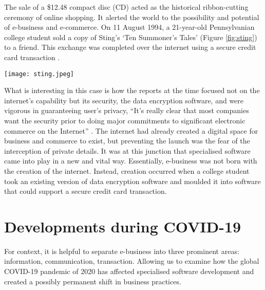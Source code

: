 \documentclass[a0,portrait]{a0poster}
\begin{document}
\begin{multicols}{2}
The sale of a \$12.48 compact disc (CD) acted as the historical ribbon-cutting ceremony of online shopping. It alerted the world to the possibility and potential of e-business and e-commerce. On 11 August 1994, a 21-year-old Pennsylvanian college student sold a copy of Sting’s ‘Ten Summoner’s Tales’ (Figure \ref{fig:sting}) to a friend. This exchange was completed over the internet using a secure credit card transaction \cite{arcand}.

\begin{wraptable}{l}{13cm} %
\begin{center}
\texttt{[image: sting.jpeg]}
\label{fig:sting}
\end{center}
\end{wraptable}

What is interesting in this case is how the reports at the time focused not on the internet’s capability but its security, the data encryption software, and were vigorous in guaranteeing user’s privacy, “It’s really clear that most companies want the security prior to doing major commitments to significant electronic commerce on the Internet” \cite{lewis}. The internet had already created a digital space for business and commerce to exist, but preventing the launch was the fear of the interception of private details. It was at this junction that specialised software came into play in a new and vital way. Essentially, e-business was not born with the creation of the internet. Instead, creation occurred when a college student took an existing version of data encryption software and moulded it into software that could support a secure credit card transaction. \par

\section*{Developments during COVID-19}
For context, it is helpful to separate e-business into three prominent areas: information, communication, transaction. Allowing us to examine how the global COVID-19 pandemic of 2020 has affected specialised software development and created a possibly permanent shift in business practices. \par 


\end{multicols}
\end{document}
